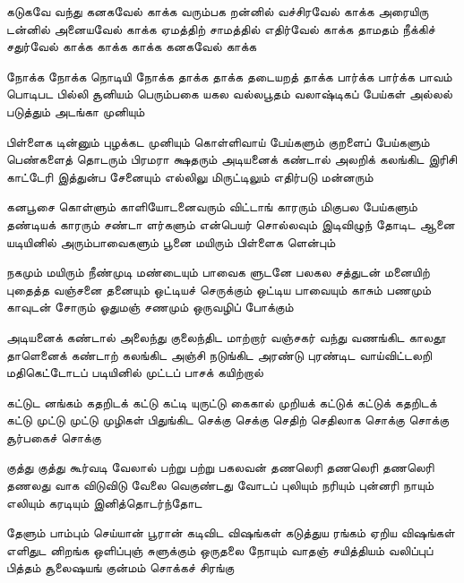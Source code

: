 \begin{flushleft}
{        கடுகவே வந்து கனகவேல் காக்க
        வரும்பக றன்னில் வச்சிரவேல் காக்க
        அரையிரு டன்னில் அனையவேல் காக்க
        ஏமத்திற் சாமத்தில் எதிர்வேல் காக்க
        தாமதம் நீக்கிச் சதுர்வேல் காக்க
        காக்க காக்க கனகவேல் காக்க
                                        
        நோக்க நோக்க நொடியி நோக்க
        தாக்க தாக்க தடையறத் தாக்க
        பார்க்க பார்க்க பாவம் பொடிபட
        பில்லி சூனியம் பெரும்பகை யகல
        வல்லபூதம் வலாஷ்டிகப் பேய்கள்
        அல்லல் படுத்தும் அடங்கா முனியும்
                                        
        பிள்ளைக டின்னும் புழக்கட முனியும்
        கொள்ளிவாய் பேய்களும் குறளைப் பேய்களும்
        பெண்களைத் தொடரும் பிரமரா க்ஷதரும்
        அடியனைக் கண்டால் அலறிக் கலங்கிட
        இரிசி காட்டேரி இத்துன்ப சேனையும்
        எல்லிலு மிருட்டிலும் எதிர்படு மன்னரும்
                                        
        கனபூசை கொள்ளும் காளியோடனைவரும்
        விட்டாங் காரரும் மிகுபல பேய்களும்
        தண்டியக் காரரும் சண்டா ளர்களும்
        என்பெயர் சொல்லவும் இடிவிழுந் தோடிட
        ஆனை யடியினில் அரும்பாவைகளும்
        பூனை மயிரும் பிள்ளைக ளென்பும்
                                        
        நகமும் மயிரும் நீண்முடி மண்டையும்
        பாவைக ளுடனே பலகல சத்துடன்
        மனையிற் புதைத்த வஞ்சனை தனையும்
        ஒட்டியச் செருக்கும் ஒட்டிய பாவையும்
        காசும் பணமும் காவுடன் சோரும்
        ஓதுமஞ் சணமும் ஒருவழிப் போக்கும்
                                        
        அடியனைக் கண்டால் அலைந்து குலைந்திட
        மாற்றார் வஞ்சகர் வந்து வணங்கிட
        காலதூ தாளெனைக் கண்டாற் கலங்கிட
        அஞ்சி நடுங்கிட அரண்டு புரண்டிட
        வாய்விட்டலறி மதிகெட்டோடப்
        படியினில் முட்டப் பாசக் கயிற்றால்
                                        
        கட்டுட னங்கம் கதறிடக் கட்டு
        கட்டி யுருட்டு கைகால் முறியக்
        கட்டுக் கட்டுக் கதறிடக் கட்டு
        முட்டு முட்டு முழிகள் பிதுங்கிட
        செக்கு செக்கு செதிற் செதிலாக
        சொக்கு சொக்கு சூர்பகைச் சொக்கு
                                        
        குத்து குத்து கூர்வடி வேலால்
        பற்று பற்று பகலவன் தணலெரி
        தணலெரி தணலெரி தணலது வாக
        விடுவிடு வேலை வெகுண்டது வோடப்
        புலியும் நரியும் புன்னரி நாயும்
        எலியும் கரடியும் இனித்தொடர்ந்தோட
                                        
        தேளும் பாம்பும் செய்யான் பூரான்
        கடிவிட விஷங்கள் கடுத்துய ரங்கம்
        ஏறிய விஷங்கள் எளிதுட னிறங்க
        ஒளிப்புஞ் சுளுக்கும் ஒருதலை நோயும்
        வாதஞ் சயித்தியம் வலிப்புப் பித்தம்
        சூலைஷயங் குன்மம் சொக்கச் சிரங்கு
                                        
}
\end{flushleft}

